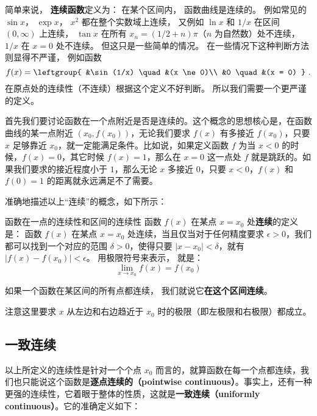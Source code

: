 

简单来说， \textbf{连续函数}定义为： 在某个区间内， 函数曲线是连续的。 例如常见的 $\sin x$， $\exp x$， $x^2$ 都在整个实数域上连续， 又例如 $\ln x$ 和 $1/x$ 在区间 $(0, \infty)$ 上连续， $\tan x$ 在所有 $x_n = (1/2 + n)\pi$（$n$ 为自然数）处不连续， $1/x$ 在 $x = 0$ 处不连续。 但这只是一些简单的情况。 在一些情况下这种判断方法则显得不严谨， 例如函数
\begin{equation}
f(x) = \leftgroup{
    &\sin(1/x) \quad &(x \ne 0)\\
    &0  \quad &(x = 0)
}~.
\end{equation}
在原点处的连续性（不连续）根据这个定义不好判断。 所以我们需要一个更严谨的定义。

首先我们要讨论函数在一个点附近是否是连续的。这个概念的思想核心是，在函数曲线的某一点附近 $(x_0, f(x_0))$，无论我们要求 $f(x)$ 有多接近 $f(x_0)$，只要 $x$ 足够靠近 $x_0$，就一定能满足条件。比如说，如果定义函数 $f$ 为当 $x<0$ 的时候，$f(x)=0$，其它时候 $f(x)=1$，那么在 $x=0$ 这一点处 $f$ 就是跳跃的。如果我们要求的接近程度小于 $1$，那么无论 $x$ 多接近 $0$，只要 $x<0$，$f(x)$ 和 $f(0)=1$ 的距离就永远满足不了需要。

准确地描述以上“连续”的概念，如下所示：

\begin{definition}{函数在一点的连续性和区间的连续性}
函数 $f(x)$ 在某点 $x = x_0$ 处\textbf{连续}的定义是： 函数 $f(x)$ 在某点 $x=x_0$ 处连续，当且仅当对于任何精度要求 $\epsilon>0$，我们都可以找到一个对应的范围 $\delta>0$，使得只要 $|x-x_0|<\delta$，就有 $|f(x)-f(x_0)|<\epsilon$。 用极限符号来表示， 就是：
\begin{equation}
\lim_{x \to x_0} f(x) = f(x_0)
\end{equation}

如果一个函数在某区间的所有点都连续， 我们就说它\textbf{在这个区间连续}。
\end{definition}

注意这里要求 $x$ 从左边和右边趋近于 $x_0$ 时的极限（即左极限和右极限）都成立。 %

\subsection{一致连续}

以上所定义的连续性是针对一个个点 $x_0$ 而言的，就算函数在每一个点都连续，我们也只能说这个函数是\textbf{逐点连续的（pointwise continuous）}。事实上，还有一种更强的连续性，它着眼于整体的性质，这就是\textbf{一致连续（uniformly continuous）}。它的准确定义如下：

